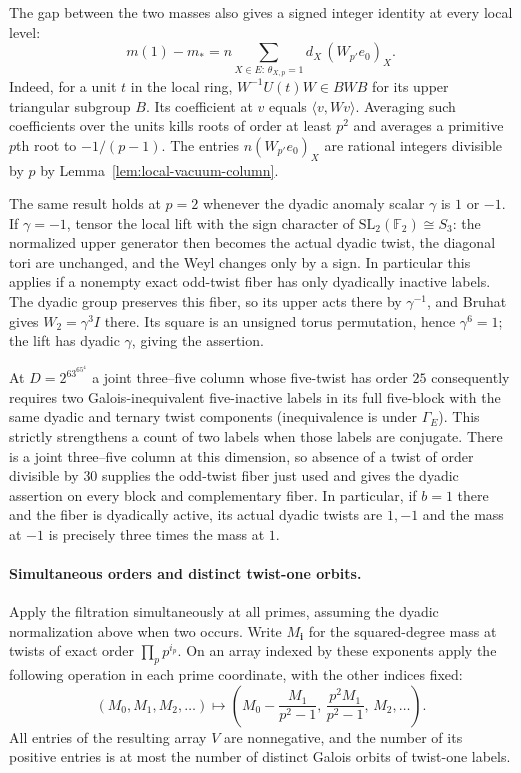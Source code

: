 \documentclass[11pt,a4paper]{article}
\numberwithin{equation}{section}
\theoremstyle{remark}
\begin{document}
The gap between the two masses also gives a signed integer identity at
every local level:
\[
 m(1)-m_*=
 n\!\sum_{X\in E:\,\theta_{X,p}=1}
       d_X\,(W_{p'}e_0)_X .
\]
Indeed, for a unit $t$ in the local ring, $W^{-1}U(t)W\in BWB$
for its upper triangular subgroup $B$. Its coefficient at $v$ equals
$\langle v,Wv\rangle$. Averaging such coefficients over the units kills
roots of order at least $p^2$ and averages a primitive $p$th root to
$-1/(p-1)$. The entries $n(W_{p'}e_0)_X$ are rational integers
divisible by $p$ by Lemma~\ref{lem:local-vacuum-column}.

The same result holds at $p=2$ whenever the dyadic anomaly scalar
$\gamma$ is $1$ or $-1$. If $\gamma=-1$, tensor the local lift with
the sign character of $\mathrm{SL}_2(\mathbb F_2)\cong S_3$:
the normalized upper generator then becomes the actual dyadic twist,
the diagonal tori are unchanged, and the Weyl changes only by a sign.
In particular this applies if a nonempty exact odd-twist fiber has
only dyadically inactive labels. The dyadic group preserves this
fiber, so its upper acts there by $\gamma^{-1}$, and Bruhat gives
$W_2=\gamma^3 I$ there. Its square is an unsigned torus permutation,
hence $\gamma^6=1$; the lift has dyadic $\gamma$, giving the assertion.

At $D=2^63^65^4$ a joint three--five column whose five-twist has order
$25$ consequently requires two Galois-inequivalent five-inactive
labels in its full five-block with the same dyadic and ternary twist
components (inequivalence is under $\Gamma_E$). This strictly
strengthens a count of two labels when those labels are conjugate.
There is a joint three--five column at this dimension, so absence
of a twist of order divisible by $30$ supplies the odd-twist fiber
just used and gives the dyadic assertion on every block and
complementary fiber. In particular, if $b=1$ there and the fiber
is dyadically active, its actual dyadic twists are $1,-1$ and the
mass at $-1$ is precisely three times the mass at $1$.

\paragraph{Simultaneous orders and distinct twist-one orbits.}
Apply the filtration simultaneously at all primes, assuming the
dyadic normalization above when two occurs. Write
$M_{\boldsymbol i}$ for the squared-degree mass at twists of exact
order $\prod_p p^{i_p}$. On an array indexed by these exponents
apply the following operation in each prime coordinate, with the
other indices fixed:
\[
 (M_0,M_1,M_2,\ldots)\longmapsto
 \left(M_0-\frac{M_1}{p^2-1},\,
       \frac{p^2M_1}{p^2-1},\,M_2,\ldots\right).
\]
All entries of the resulting array $V$ are nonnegative, and the
number of its positive entries is at most the number of distinct
Galois orbits of twist-one labels.
\end{document}
